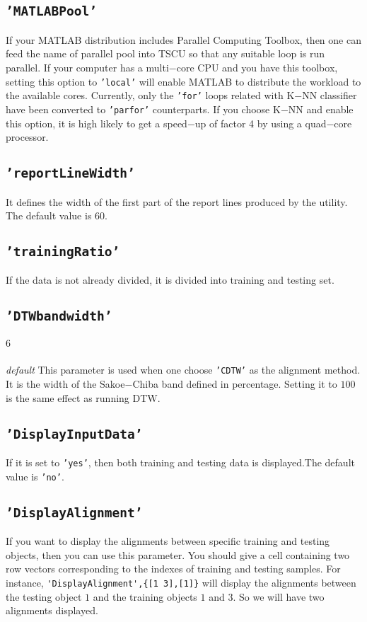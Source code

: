\documentclass{article}
\newcommand{\parametre}[1]{\texttt{#1}}
\begin{document}
\subsection{\parametre{'MATLABPool'}}
If your MATLAB distribution includes Parallel Computing Toolbox, then one can feed the name of parallel pool into TSCU so that any suitable loop is run parallel. If your computer has a multi$-$core CPU and you have this toolbox, setting this option to \parametre{'local'} will enable MATLAB to distribute the workload to the available cores. Currently, only the \parametre{'for'} loops related with K$-$NN classifier have been converted to \parametre{'parfor'} counterparts. If you choose K$-$NN and enable this option, it is high likely to get a speed$-$up of factor 4 by using a quad$-$core processor.

\subsection{\parametre{'reportLineWidth'}}
It defines the width of the first part of the report lines produced by the utility. The default value is $60$.

\subsection{\parametre{'trainingRatio'}}
If the data is not already divided, it is divided into training and testing set.

\subsection{\parametre{'DTWbandwidth'}} 
\subparagraph*{$6$} \textit{default} This parameter is used when one choose \parametre{'CDTW'} as the alignment method. 
It is the width of the Sakoe$-$Chiba band defined in percentage. Setting it to $100$ is the same effect as running DTW.\@

\subsection{\parametre{'DisplayInputData'}} 
If it is set to \parametre{'yes'}, then both training and testing data is displayed.The default value is \parametre{'no'}.

\subsection{\parametre{'DisplayAlignment'}}
If you want to display the alignments between specific training and testing objects, then you can use this parameter. 
You should give a cell containing two row vectors corresponding to the indexes of training and testing samples. 
For instance, \verb|'DisplayAlignment',{[1 3],[1]}| will display the alignments between the testing object $1$ and the training objects $1$ and $3$. 
So we will have two alignments displayed.
\end{document}
